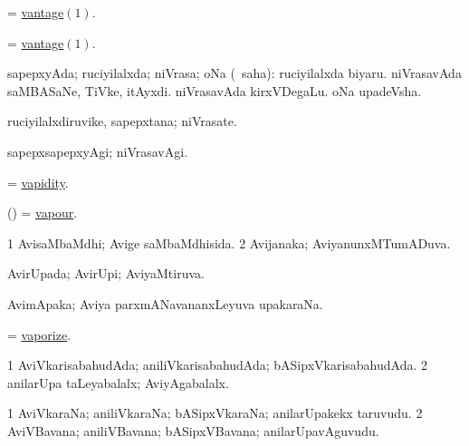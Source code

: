 \bentry
{}
\gl{\nA}
\expl{}
\bmng
 = \hyperlink{vantage}{vantage\((1)\)}. 
\emng
\eentry

\bentry
{}
\gl{\nA}
\expl{}
\bmng
 = \hyperlink{vantage}{vantage\((1)\)}. 
\emng
\eentry

\bentry
{} 
\gl{\gu}
\expl{}
\bmng
 sapepxyAda; ruciyilalxda; niVrasa; oNa (\rUpa\ saha):  ruciyilalxda biyaru.  niVrasavAda saMBASaNe, TiVke, itAyxdi.  niVrasavAda kirxVDegaLu.  oNa upadeVsha. 
\emng
\eentry

\bentry
{} 
\gl{\nA}
\expl{}
\bmng
 ruciyilalxdiruvike, sapepxtana; niVrasate. 
\emng
\eentry

\bentry
{} 
\gl{\kirxvi}
\expl{}
\bmng
 sapepxsapepxyAgi; niVrasavAgi. 
\emng
\eentry

\bentry
{} 
\gl{\nA}
\expl{}
\bmng
 = \hyperlink{vapidity}{vapidity}. 
\emng
\eentry

\bentry
{} 
\gl{\nA}
\expl{}
\bmng
 (\ame) = \hyperlink{vapour(1)}{vapour}. 
\emng
\eentry

\bentry
{} 
\gl{\gu}
\expl{}
\bmng
\bnum
\num{1} AvisaMbaMdhi; Avige saMbaMdhisida. 
\num{2} Avijanaka; AviyanunxMTumADuva. 
\enum
\emng
\eentry

\bentry
{} 
\gl{\gu}
\expl{}
\bmng
 AvirUpada; AvirUpi; AviyaMtiruva. 
\emng
\eentry

\bentry
{} 
\gl{\nA}
\expl{}
\bmng
 AvimApaka; Aviya parxmANavananxLeyuva upakaraNa. 
\emng
\eentry

\bentry
{} 
\gl{\kirx}
\expl{}
\bmng
 = \hyperlink{vaporize}{vaporize}. 
\emng
\eentry

\bentry
{} 
\gl{\gu}
\expl{}
\bmng
\bnum
\num{1} AviVkarisabahudAda; aniliVkarisabahudAda; bASipxVkarisabahudAda. 
\num{2} anilarUpa taLeyabalalx; AviyAgabalalx. 
\enum
\emng
\eentry

\bentry
{} 
\gl{\nA}
\expl{}
\bmng
\bnum
\num{1} AviVkaraNa; aniliVkaraNa; bASipxVkaraNa; anilarUpakekx taruvudu. 
\num{2} AviVBavana; aniliVBavana; bASipxVBavana; anilarUpavAguvudu. 
\enum
\emng
\eentry

